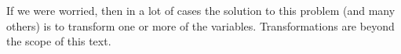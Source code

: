 If we were worried, then in a lot of cases the solution to this problem (and many others) is to transform one or more of the variables. Transformations are beyond the scope of this text.

\begin{comment} %

\SUBSECTION{Checking for collinearity~\label{sec:regressioncollinearity}}

The last kind of regression diagnostic that I'm going to discuss in this chapter is the use of \keyterm{variance inflation factors} (VIFs), which are useful for determining whether or not the predictors in your regression model are too highly correlated with each other. There is a variance inflation factor associated with each predictor $X_k$ in the model. 

\vspace{0.5cm}
\begin{mdframed}[style=MyFrame,nobreak=true]
The formula for the $k$-th VIF is:
$$
\mbox{VIF}_k = \frac{1}{1-{R^2_{(-k)}}}
$$
where $R^2_{(-k)}$ refers to $R$-squared value you would get if you ran a regression using $X_k$ as the outcome variable, and all the other $X$ variables as the predictors. The idea here is that $R^2_{(-k)}$ is a very good measure of the extent to which $X_k$ is correlated with all the other variables in the model. 
\end{mdframed}


The square root of the VIF is pretty interpretable. It tells you how much wider the confidence interval for the corresponding coefficient $b_k$ is, relative to what you would have expected if the predictors are all nice and uncorrelated with one another. If you've only got two predictors, the VIF values are always going to be the same, as we can see if we click on the `Collinearity' checkbox in the `Regression' - `Assumptions' options in jamovi. For both \rtext{dan.sleep} and \rtext{baby.sleep} the VIF is 1.65. And since the square root of 1.65 is 1.28, we see that the correlation between our two predictors isn't causing much of a problem. 

To give a sense of how we could end up with a model that has bigger collinearity problems, suppose I were to run a much less interesting regression model, in which I tried to predict the \rtext{day} on which the data were collected, as a function of all the other variables in the data set. To see why this would be a bit of a problem, let's have a look at the correlation matrix for all four variables:


\end{comment}
